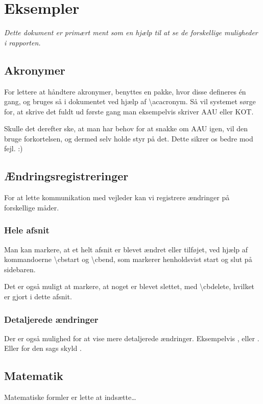 \chapter{Eksempler}

{\itshape Dette dokument er primært ment som en hjælp til at se de forskellige muligheder
i rapporten.}

\section{Akronymer}
For lettere at håndtere akronymer, benyttes en pakke, hvor disse defineres én gang, og bruges så i
dokumentet ved hjælp af \textbackslash ac{acronym}. Så vil systemet sørge for, at skrive det fuldt
ud første gang man eksempelvis skriver \ac{AAU} eller \ac{KOT}.

Skulle det derefter ske, at man har behov for at snakke om \ac{AAU} igen, vil den bruge forkortelsen,
og dermed selv holde styr på det. Dette sikrer os bedre mod fejl. :)

\section{Ændringsregistreringer}
For at lette kommunikation med vejleder kan vi registrere ændringer på forskellige måder.

\subsection{Hele afsnit}
\cbstart Man kan markere, at et helt afsnit er blevet ændret eller tilføjet, ved hjælp af kommandoerne
\textbackslash cbstart og \textbackslash cbend, som markerer henholdsvist start og slut på sidebaren.\cbend

Det er også muligt at markere, at noget er blevet slettet, med \textbackslash cbdelete, hvilket er gjort i
dette \cbdelete afsnit.

\subsection{Detaljerede ændringer}
Der er også mulighed for at vise mere detaljerede ændringer. Eksempelvis ,
eller . Eller for den sags skyld .

\section{Matematik}
Matematiske formler er lette at indsætte\ldots

